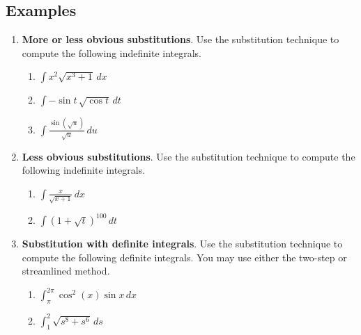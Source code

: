 \documentclass[11pt]{article}
\theoremstyle{definition}
\theoremstyle{named}
\numberwithin{myalgctr}{section}
\begin{document}
\subsection*{Examples}
\begin{enumerate}
  \item {\bf More or less obvious substitutions}. Use the substitution technique to compute the following indefinite integrals.
  \begin{enumerate}
    \item $\displaystyle\int x^2\sqrt{x^3+1}\, dx$
    \item $\displaystyle\int -\sin t\, \sqrt{\cos t}\, dt$
    \item $\displaystyle\int \frac{\sin(\sqrt{u})}{\sqrt{u}}\, du$

  \end{enumerate}
  \item {\bf Less obvious substitutions}. Use the substitution technique to compute the following indefinite integrals.
  \begin{enumerate}
    \item $\displaystyle\int\frac{x}{\sqrt{x+1}}\, dx$
    \item $\displaystyle\int (1+\sqrt{t})^{100}\, dt$
  \end{enumerate}
\item {\bf Substitution with definite integrals}. Use the substitution technique to compute the following definite integrals. You may use either the two-step or streamlined method.
\begin{enumerate}
  \item $\displaystyle\int_{\pi}^{2\pi}\cos^2(x)\sin x\, dx$
  \item $\displaystyle\int_{1}^{2} \sqrt{s^8+s^6}\, ds$
\end{enumerate}
\end{enumerate}
\end{document}

